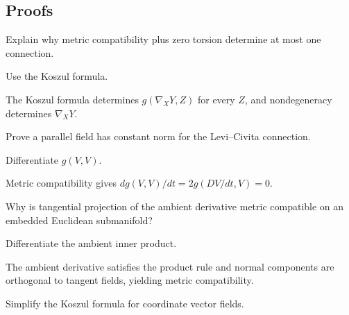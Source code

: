 \subsection*{Proofs}

\begin{exercise}[Uniqueness]\label{exr:vii22-ped-06}
Explain why metric compatibility plus zero torsion determine at most one connection.
\end{exercise}

\begin{hint}
Use the Koszul formula.
\end{hint}

\begin{solution}
The Koszul formula determines \(g(\nabla_XY,Z)\) for every \(Z\), and nondegeneracy determines \(\nabla_XY\).
\end{solution}

\begin{exercise}\label{exr:vii22-ped-07}
Prove a parallel field has constant norm for the Levi--Civita connection.
\end{exercise}

\begin{hint}
Differentiate \(g(V,V)\).
\end{hint}

\begin{solution}
Metric compatibility gives \(d g(V,V)/dt=2g(DV/dt,V)=0\).
\end{solution}

\begin{exercise}\label{exr:vii22-ped-08}
Why is tangential projection of the ambient derivative metric compatible on an embedded Euclidean submanifold?
\end{exercise}

\begin{hint}
Differentiate the ambient inner product.
\end{hint}

\begin{solution}
The ambient derivative satisfies the product rule and normal components are orthogonal to tangent fields, yielding metric compatibility.
\end{solution}

\begin{exercise}\label{exr:vii22-ped-09}
Simplify the Koszul formula for coordinate vector fields.
\end{exercise}

